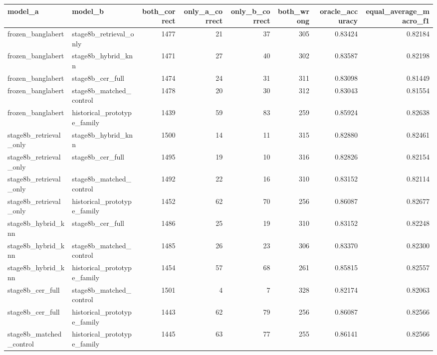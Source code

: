 \begin{tabular}{llrrrrrr}
\toprule
model_a & model_b & both_correct & only_a_correct & only_b_correct & both_wrong & oracle_accuracy & equal_average_macro_f1 \\
\midrule
frozen_banglabert & stage8b_retrieval_only & 1477 & 21 & 37 & 305 & 0.83424 & 0.82184 \\
frozen_banglabert & stage8b_hybrid_knn & 1471 & 27 & 40 & 302 & 0.83587 & 0.82198 \\
frozen_banglabert & stage8b_cer_full & 1474 & 24 & 31 & 311 & 0.83098 & 0.81449 \\
frozen_banglabert & stage8b_matched_control & 1478 & 20 & 30 & 312 & 0.83043 & 0.81554 \\
frozen_banglabert & historical_prototype_family & 1439 & 59 & 83 & 259 & 0.85924 & 0.82638 \\
stage8b_retrieval_only & stage8b_hybrid_knn & 1500 & 14 & 11 & 315 & 0.82880 & 0.82461 \\
stage8b_retrieval_only & stage8b_cer_full & 1495 & 19 & 10 & 316 & 0.82826 & 0.82154 \\
stage8b_retrieval_only & stage8b_matched_control & 1492 & 22 & 16 & 310 & 0.83152 & 0.82114 \\
stage8b_retrieval_only & historical_prototype_family & 1452 & 62 & 70 & 256 & 0.86087 & 0.82677 \\
stage8b_hybrid_knn & stage8b_cer_full & 1486 & 25 & 19 & 310 & 0.83152 & 0.82248 \\
stage8b_hybrid_knn & stage8b_matched_control & 1485 & 26 & 23 & 306 & 0.83370 & 0.82300 \\
stage8b_hybrid_knn & historical_prototype_family & 1454 & 57 & 68 & 261 & 0.85815 & 0.82557 \\
stage8b_cer_full & stage8b_matched_control & 1501 & 4 & 7 & 328 & 0.82174 & 0.82063 \\
stage8b_cer_full & historical_prototype_family & 1443 & 62 & 79 & 256 & 0.86087 & 0.82566 \\
stage8b_matched_control & historical_prototype_family & 1445 & 63 & 77 & 255 & 0.86141 & 0.82566 \\
\bottomrule
\end{tabular}
